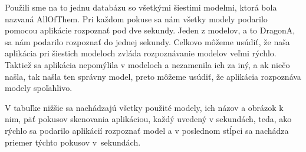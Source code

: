 Použili sme na to jednu databázu so všetkými šiestimi modelmi, ktorá bola nazvaná AllOfThem. Pri každom pokuse sa nám všetky modely podarilo pomocou aplikácie rozpoznať pod dve sekundy. Jeden z modelov, a to DragonA, sa nám podarilo rozpoznať do jednej sekundy. Celkovo môžeme usúdiť, že naša aplikácia pri šiestich modeloch zvláda rozpoznávanie modelov veľmi rýchlo. Taktiež sa aplikácia nepomýlila v modeloch a nezamenila ich za iný, a ak niečo našla, tak našla ten správny model, preto môžeme usúdiť, že aplikácia rozpoznáva modely spoľahlivo.

V tabuľke nižšie sa nachádzajú všetky použité modely, ich názov a obrázok k nim, päť pokusov skenovania aplikáciou, každý uvedený v sekundách, teda, ako rýchlo sa podarilo aplikácií rozpoznať model a v poslednom stĺpci sa nachádza priemer týchto pokusov v~sekundách.

